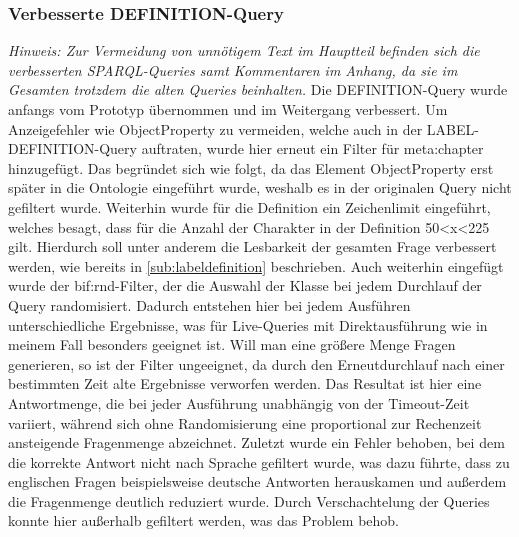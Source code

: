 \documentclass[headsepline,titlepage,ngerman,twoside,12pt]{report}
\begin{document}
\subsubsection{Verbesserte DEFINITION-Query}

\textit{Hinweis: Zur Vermeidung von unnötigem Text im Hauptteil befinden sich die verbesserten SPARQL-Queries samt Kommentaren im Anhang, da sie im Gesamten trotzdem die alten Queries beinhalten.}
Die DEFINITION-Query wurde anfangs vom Prototyp übernommen und im Weitergang verbessert.
Um Anzeigefehler wie ObjectProperty zu vermeiden, welche auch in der LABEL-DEFINITION-Query auftraten, wurde hier erneut ein Filter für meta:chapter hinzugefügt.
Das begründet sich wie folgt, da das Element ObjectProperty erst später in die Ontologie eingeführt wurde, weshalb es in der originalen Query nicht gefiltert wurde.
Weiterhin wurde für die Definition ein Zeichenlimit eingeführt, welches besagt, dass für die Anzahl der Charakter in der Definition 50<x<225 gilt. Hierdurch soll unter anderem die Lesbarkeit der gesamten Frage verbessert werden, wie bereits in \cref{sub:labeldefinition} beschrieben.
Auch weiterhin eingefügt wurde der bif:rnd-Filter, der die Auswahl der Klasse bei jedem Durchlauf der Query randomisiert. Dadurch entstehen hier bei jedem Ausführen unterschiedliche Ergebnisse, was für Live-Queries mit Direktausführung wie in meinem Fall besonders geeignet ist.
Will man eine größere Menge Fragen generieren, so ist der Filter ungeeignet, da durch den Erneutdurchlauf nach einer bestimmten Zeit alte Ergebnisse verworfen werden. Das Resultat ist hier eine Antwortmenge, die bei jeder Ausführung unabhängig von der Timeout-Zeit variiert, während sich ohne Randomisierung eine proportional zur Rechenzeit ansteigende Fragenmenge abzeichnet.
Zuletzt wurde ein Fehler behoben, bei dem die korrekte Antwort nicht nach Sprache gefiltert wurde, was dazu führte, dass zu englischen Fragen beispielsweise deutsche Antworten herauskamen und außerdem die Fragenmenge deutlich reduziert wurde.
Durch Verschachtelung der Queries konnte hier außerhalb gefiltert werden, was das Problem behob.
\end{document}
